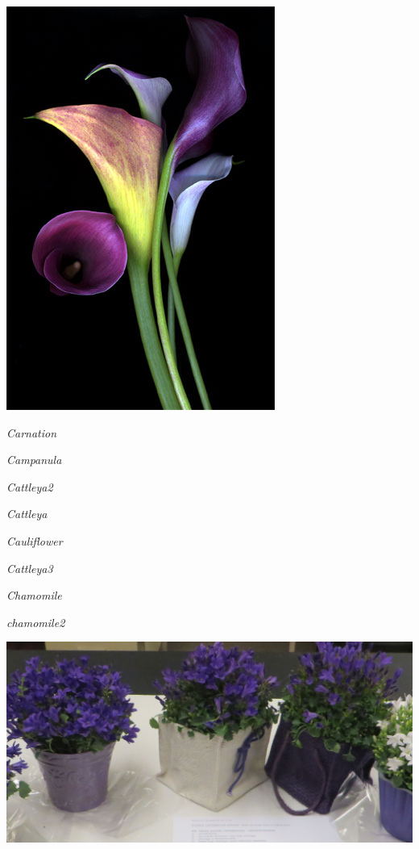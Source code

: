 \documentclass{article}
\begin{document}
\begin{center}
\includegraphics[height=0.9\textheight, angle=90]{../CallaLily_color.jpg}
\end{center}
\newpage

\noindent
\vfill
\centerline{{\Large\emph{Carnation}}}
\vfill
\newpage

\noindent
\vfill
\centerline{{\Large\emph{Campanula}}}
\vfill
\newpage

\noindent
\vfill
\centerline{{\Large\emph{Cattleya2}}}
\vfill
\newpage

\noindent
\vfill
\centerline{{\Large\emph{Cattleya}}}
\vfill
\newpage

\noindent
\vfill
\centerline{{\Large\emph{Cauliflower}}}
\vfill
\newpage

\noindent
\vfill
\centerline{{\Large\emph{Cattleya3}}}
\vfill
\newpage

\noindent
\vfill
\centerline{{\Large\emph{Chamomile}}}
\vfill
\newpage

\noindent
\vfill
\centerline{{\Large\emph{chamomile2}}}
\vfill
\newpage

\begin{center}
\includegraphics[height=0.9\textheight, angle=90]{../Campanula.jpg}
\end{center}
\newpage
\end{document}
